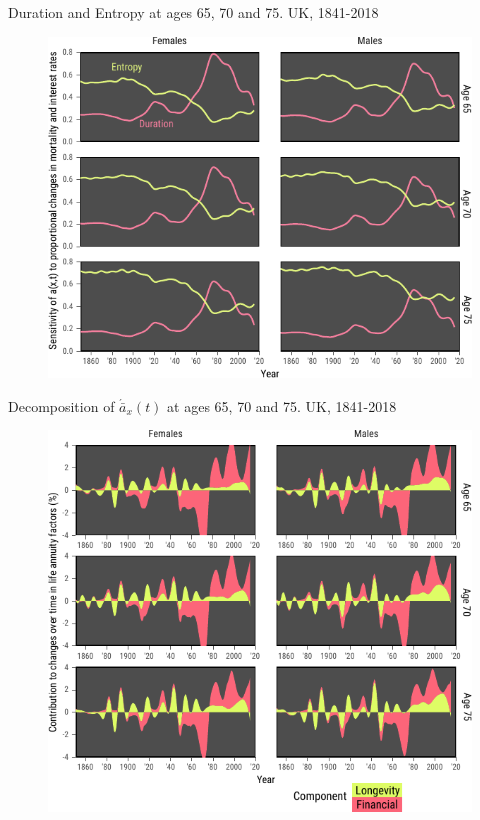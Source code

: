 \documentclass[10pt]{beamer}
\begin{document}
\begin{frame}{Duration and Entropy at ages 65, 70 and 75. UK, 1841-2018}
\begin{figure}
	\centering
	\hspace*{-0.8cm}
	\includegraphics[scale=1] {Fig3.pdf}
\end{figure}
\end{frame}

\begin{frame}{Decomposition of $\acute{\bar{a}}_x(t)$ at ages 65, 70 and 75. UK, 1841-2018}
\begin{figure}
	\centering
	\hspace*{-0.8cm}
	\includegraphics[scale=0.9] {Fig4.pdf}
\end{figure}
\end{frame}
\end{document}
